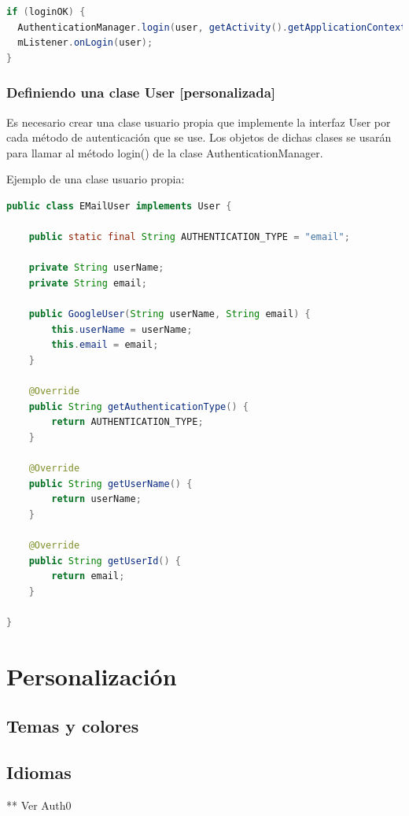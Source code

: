 \begin{lstlisting}[language=Java, frame=tlb]	
if (loginOK) {
  AuthenticationManager.login(user, getActivity().getApplicationContext());
  mListener.onLogin(user);
}
\end{lstlisting}


\subsubsection{Definiendo una clase User [personalizada]}

Es necesario crear una clase usuario propia que implemente la interfaz User por cada método de autenticación que se use. Los objetos de dichas clases se usarán para llamar al método login() de la clase AuthenticationManager.

Ejemplo de una clase usuario propia:
\begin{lstlisting}[language=Java, frame=tlb]	
public class EMailUser implements User {

    public static final String AUTHENTICATION_TYPE = "email";

    private String userName;
    private String email;

    public GoogleUser(String userName, String email) {
        this.userName = userName;
        this.email = email;
    }

    @Override
    public String getAuthenticationType() {
        return AUTHENTICATION_TYPE;
    }

    @Override
    public String getUserName() {
        return userName;
    }

    @Override
    public String getUserId() {
        return email;
    }

}
\end{lstlisting}



\section{Personalización}

\subsection{Temas y colores}

\subsection{Idiomas}


** Ver Auth0

